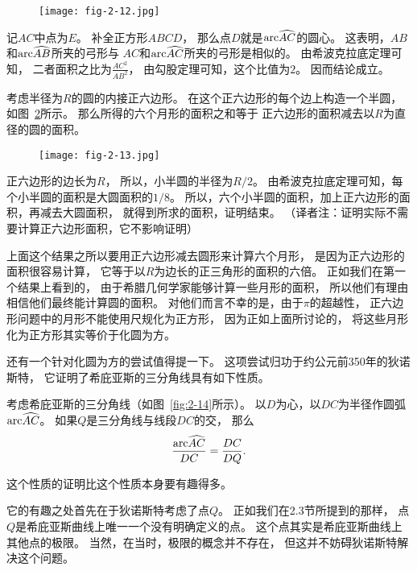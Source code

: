 \documentclass[cn,fancy,blue,11pt]{elegantbook}
\newcommand{\arc}{{\rm arc}\widehat}
\begin{document}
\begin{figure}[htbp]
	\centering
	\texttt{[image: fig-2-12.jpg]}
	\caption{\label{fig:2-12}}
\end{figure}

记$AC$中点为$E$。
补全正方形$ABCD$，
那么点$D$就是$\arc{AC}$的圆心。
这表明，$AB$和$\arc{AB}$所夹的弓形与
$AC$和$\arc{AC}$所夹的弓形是相似的。
由希波克拉底定理可知，
二者面积之比为$\frac{AC^2}{AB^2}$，
由勾股定理可知，这个比值为$2$。
因而结论成立。

\begin{proposition*}{}{}
	考虑半径为$R$的圆的内接正六边形。
	在这个正六边形的每个边上构造一个半圆，
	如图~\ref{fig:2-13}所示。
	那么所得的六个月形的面积之和等于
	正六边形的面积减去以$R$为直径的圆的面积。
\end{proposition*}

\begin{figure}[htbp]
	\centering
	\texttt{[image: fig-2-13.jpg]}
	\caption{\label{fig:2-13}}
\end{figure}

正六边形的边长为$R$，
所以，小半圆的半径为$R/2$。
由希波克拉底定理可知，每个小半圆的面积是大圆面积的$1/8$。
所以，六个小半圆的面积，加上正六边形的面积，再减去大圆面积，
就得到所求的面积，证明结束。
（译者注：证明实际不需要计算正六边形面积，它不影响证明）

上面这个结果之所以要用正六边形减去圆形来计算六个月形，
是因为正六边形的面积很容易计算，
它等于以$R$为边长的正三角形的面积的六倍。
正如我们在第一个结果上看到的，
由于希腊几何学家能够计算一些月形的面积，
所以他们有理由相信他们最终能计算圆的面积。
对他们而言不幸的是，由于$\pi$的超越性，
正六边形问题中的月形不能使用尺规化为正方形，
因为正如上面所讨论的，
将这些月形化为正方形其实等价于化圆为方。

还有一个针对化圆为方的尝试值得提一下。
这项尝试归功于约公元前350年的狄诺斯特，
它证明了希庇亚斯的三分角线具有如下性质。

\begin{proposition*}{}{}
	考虑希庇亚斯的三分角线（如图~\ref{fig:2-14}所示）。
	以$D$为心，以$DC$为半径作圆弧$\arc{AC}$。
	如果$Q$是三分角线与线段$DC$的交，
	那么
	\[\frac{\arc{AC}}{DC}=\frac{DC}{DQ}.\]
\end{proposition*}

这个性质的证明比这个性质本身要有趣得多。

它的有趣之处首先在于狄诺斯特考虑了点$Q$。
正如我们在2.3节所提到的那样，
点$Q$是希庇亚斯曲线上唯一一个没有明确定义的点。
这个点其实是希庇亚斯曲线上其他点的极限。
当然，在当时，极限的概念并不存在，
但这并不妨碍狄诺斯特解决这个问题。
\end{document}
